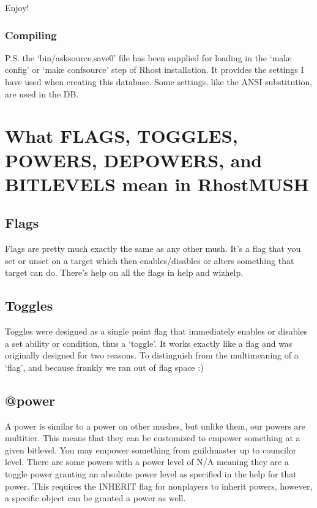 \documentclass[letterpaper,10pt,english]{sphinxmanual}
\begin{document}
\sphinxAtStartPar
Enjoy!


\subsubsection{Compiling}
\label{\detokenize{gettingstarted:compiling}}
\sphinxAtStartPar
P.S. the ‘bin/asksource.save0’ file has been supplied for loading in the
‘make config’ or ‘make confsource’ step of Rhost installation. It provides the
settings I have used when creating this database. Some settings, like the ANSI
substitution, are used in the DB.

\sphinxAtStartPar
{}


\section{What FLAGS, TOGGLES, POWERS, DEPOWERS, and BITLEVELS mean in RhostMUSH}
\label{\detokenize{toggles:what-flags-toggles-powers-depowers-and-bitlevels-mean-in-rhostmush}}\label{\detokenize{toggles::doc}}

\subsection{Flags}
\label{\detokenize{toggles:flags}}
\sphinxAtStartPar
Flags are pretty much exactly the same as any other mush.  It’s a flag
that you set or unset on a target which then enables/disables or
alters something that target can do.  There’s help on all the flags
in help and wizhelp.


\subsection{Toggles}
\label{\detokenize{toggles:toggles}}
\sphinxAtStartPar
Toggles were designed as a single point flag that immediately enables
or disables a set ability or condition, thus a ‘toggle’.  It works
exactly like a flag and was originally designed for two reasons.  To
distinguish from the multi\sphinxhyphen{}meaning of a ‘flag’, and because frankly
we ran out of flag space :)


\subsection{@power}
\label{\detokenize{toggles:power}}
\sphinxAtStartPar
A power is similar to a power on other mushes, but unlike them, our
powers are multi\sphinxhyphen{}tier.  This means that they can be customized to
empower something at a given bitlevel.  You may empower something
from guildmaster up to councilor level.  There are some powers
with a power level of N/A meaning they are a toggle power granting
an absolute power level as specified in the help for that power.
This requires the INHERIT flag for non\sphinxhyphen{}players to inherit powers,
however, a specific object can be granted a power as well.
\end{document}
